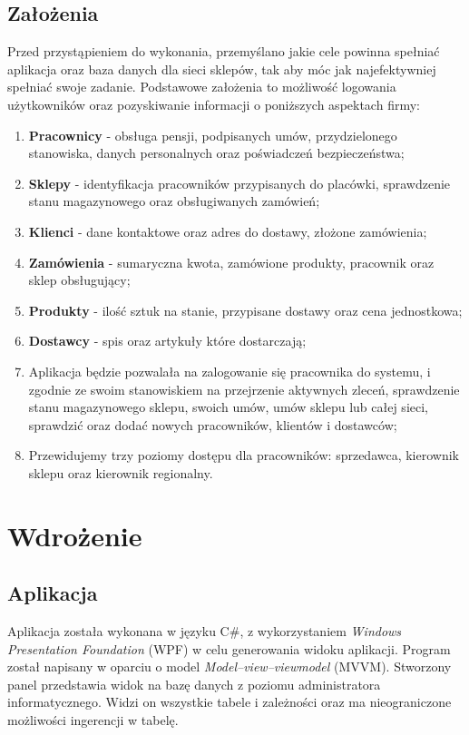 \documentclass[12pt,a4paper]{article}
\begin{document}
    \subsection{Założenia}
        Przed przystąpieniem do wykonania, przemyślano jakie cele powinna spełniać aplikacja oraz baza danych dla sieci sklepów, tak aby móc jak najefektywniej spełniać swoje zadanie. Podstawowe założenia to możliwość logowania użytkowników oraz pozyskiwanie informacji o poniższych aspektach firmy:
        \begin{enumerate}
            \item \textbf{Pracownicy} - obsługa pensji, podpisanych umów, przydzielonego stanowiska, danych personalnych oraz poświadczeń bezpieczeństwa;
            \item \textbf{Sklepy} - identyfikacja pracowników przypisanych do placówki, sprawdzenie stanu magazynowego oraz obsługiwanych zamówień;
            \item \textbf{Klienci} - dane kontaktowe oraz adres do dostawy, złożone zamówienia;
            \item \textbf{Zamówienia} - sumaryczna kwota, zamówione produkty, pracownik oraz sklep obsługujący;
            \item \textbf{Produkty} - ilość sztuk na stanie, przypisane dostawy oraz cena jednostkowa;
            \item \textbf{Dostawcy} - spis oraz artykuły które dostarczają;
            \item Aplikacja będzie pozwalała na zalogowanie się pracownika do systemu, i zgodnie ze swoim stanowiskiem na przejrzenie aktywnych zleceń, sprawdzenie stanu magazynowego sklepu, swoich umów, umów sklepu lub całej sieci, sprawdzić oraz dodać nowych pracowników, klientów i dostawców;
            \item Przewidujemy trzy poziomy dostępu dla pracowników: sprzedawca, kierownik sklepu oraz kierownik regionalny.
        \end{enumerate}
            
    
\section{Wdrożenie}
    \subsection{Aplikacja}
        Aplikacja została wykonana w języku C\#, z wykorzystaniem \textit{Windows Presentation Foundation} (WPF) w celu generowania widoku aplikacji. Program został napisany w oparciu o model \textit{Model–view–viewmodel} (MVVM). Stworzony panel przedstawia widok na bazę danych z poziomu administratora informatycznego. Widzi on wszystkie tabele i zależności oraz ma nieograniczone możliwości ingerencji w tabelę.
            
\end{document}
